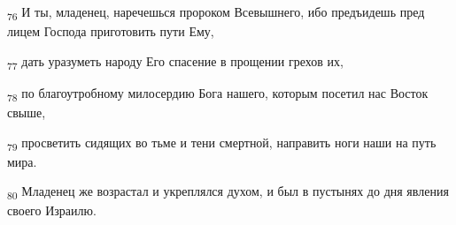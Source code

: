 \begin{tcolorbox}
\textsubscript{76} И ты, младенец, наречешься пророком Всевышнего, ибо предъидешь пред лицем Господа приготовить пути Ему,
\end{tcolorbox}
\begin{tcolorbox}
\textsubscript{77} дать уразуметь народу Его спасение в прощении грехов их,
\end{tcolorbox}
\begin{tcolorbox}
\textsubscript{78} по благоутробному милосердию Бога нашего, которым посетил нас Восток свыше,
\end{tcolorbox}
\begin{tcolorbox}
\textsubscript{79} просветить сидящих во тьме и тени смертной, направить ноги наши на путь мира.
\end{tcolorbox}
\begin{tcolorbox}
\textsubscript{80} Младенец же возрастал и укреплялся духом, и был в пустынях до дня явления своего Израилю.
\end{tcolorbox}
